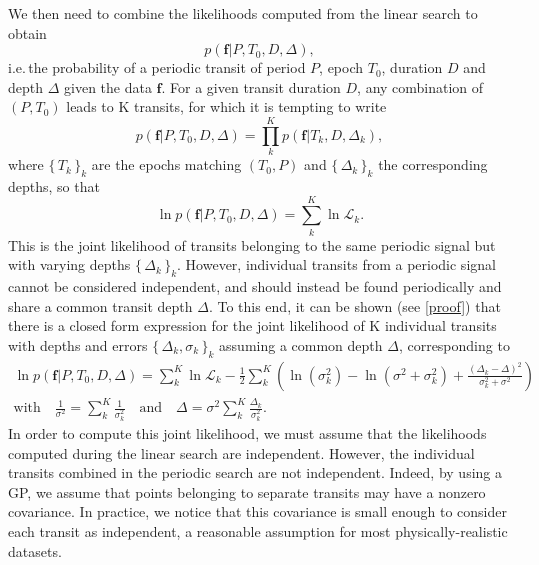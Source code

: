 \documentclass[modern,linenumbers]{aastex631}
\newcommand{\set}[1]{\{\,#1\,\}}
\begin{document}
We then need to combine the likelihoods computed from the linear search to obtain
\begin{equation*}
    p(\bm{f} \vert P, T_0 , D, \Delta),
\end{equation*}
i.e.\,the probability of a periodic transit of period $P$, epoch $T_0$, duration $D$ and depth $\Delta$ given the data $\bm{f}$. For a given transit duration $D$, any combination of $(P, T_0)$ leads to K transits, for which it is tempting to write
\begin{equation}\label{eq:attempt}
    p(\bm{f} \vert P, T_0 ,D, \Delta) = \prod_k^K p(\bm{f} \vert T_k, D, \Delta_k),
\end{equation}
where $\set{T_k}_k$ are the epochs matching $(T_0, P)$ and $\set{\Delta_k}_k$ the corresponding depths, so that
\begin{equation*}
    \ln p(\bm{f} \vert P, T_0 ,D, \Delta) = \sum_k^K \ln \mathcal{L}_k.
\end{equation*}
This is the joint likelihood of transits belonging to the same periodic signal but with varying depths  $\set{\Delta_k}_k$. However, individual transits from a periodic signal cannot be considered independent, and should instead be found periodically and share a common transit depth $\Delta$. To this end, it can be shown (see \autoref{proof}) that there is a closed form expression for the joint likelihood of K individual transits with depths and errors $\set{\Delta_k, \sigma_k}_k$ assuming a common depth $\Delta$, corresponding to 
\begin{equation}\label{eq:result}
    \begin{gathered}
        \ln p(\bm{f} \vert P, T_0 ,D, \Delta) =  \sum_{k}^K \ln \mathcal{L}_k  - \frac{1}{2} \sum_k^K\left(\ln(\sigma_{k}^2) - \ln(\sigma^{2} + \sigma_{k}^{2}) +  \frac{\left(\Delta_{k} -
        \Delta\right)^{2}}{\sigma_k^{2} + \sigma^{2}}\right) \\
        \text{with} \quad  \frac{1}{\sigma^2} = \sum_k^K \frac{1}{\sigma_k^2} \quad \text{and} \quad
        \Delta = \sigma^2 \sum_k^K {\frac{\Delta_k}{\sigma_k^2}}.
    \end{gathered}
\end{equation}
In order to compute this joint likelihood, we must assume that the likelihoods computed during the linear search are independent. However, the individual transits combined in the periodic search are not independent. Indeed, by using a GP, we assume that points belonging to separate transits may have a nonzero covariance. In practice, we notice that this covariance is small enough to consider each transit as independent, a reasonable assumption for most physically-realistic datasets.\\\\
\end{document}

